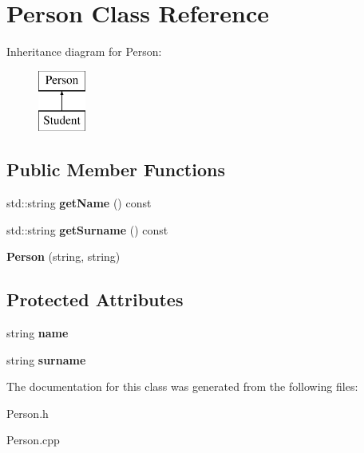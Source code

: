 \hypertarget{class_person}{}\section{Person Class Reference}
\label{class_person}
Inheritance diagram for Person\+:\begin{figure}[H]
\begin{center}
\leavevmode
\includegraphics[height=2.000000cm]{class_person}
\end{center}
\end{figure}
\subsection*{Public Member Functions}
\begin{DoxyCompactItemize}
\item 
\mbox{\label{class_person_ab20f096fdfd5201818c45754af4c3e3b}} 
std\+::string {\bfseries get\+Name} () const
\item 
\mbox{\label{class_person_acc3f116651d5ff9be12268e8eef14b60}} 
std\+::string {\bfseries get\+Surname} () const
\item 
\mbox{\label{class_person_ad7362af8633a65037a31afb045578bff}} 
{\bfseries Person} (string, string)
\end{DoxyCompactItemize}
\subsection*{Protected Attributes}
\begin{DoxyCompactItemize}
\item 
\mbox{\label{class_person_a669b64897b4d823a27bb5866368d4dfa}} 
string {\bfseries name}
\item 
\mbox{\label{class_person_a03d6fc8538ee5ee66dbc82478276c9e4}} 
string {\bfseries surname}
\end{DoxyCompactItemize}


The documentation for this class was generated from the following files\+:\begin{DoxyCompactItemize}
\item 
Person.\+h\item 
Person.\+cpp\end{DoxyCompactItemize}
